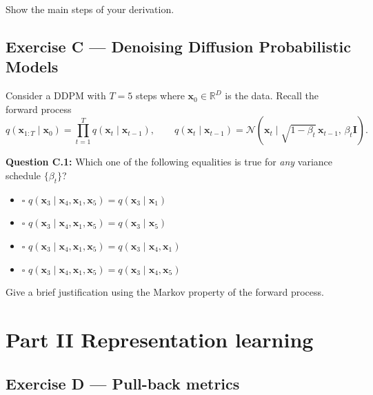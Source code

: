 \documentclass[12pt,a4paper]{article}
\newcommand{\N}{\mathcal{N}}
\begin{document}
Show the main steps of your derivation.

\vspace{3cm}

\newpage
\subsection*{Exercise C --- Denoising Diffusion Probabilistic Models}

Consider a DDPM with $T=5$ steps where $\mathbf{x}_0\in\mathbb{R}^D$ is the data.  Recall the
forward process
\[
  q(\mathbf{x}_{1:T}\mid\mathbf{x}_0) = \prod_{t=1}^T q(\mathbf{x}_t\mid\mathbf{x}_{t-1}),
  \qquad
  q(\mathbf{x}_t\mid\mathbf{x}_{t-1}) = \N(\mathbf{x}_t\mid\sqrt{1-\beta_t}\,\mathbf{x}_{t-1},\,\beta_t\mathbf{I}). \tag{3}
\]

\textbf{Question C.1:} Which one of the following equalities is true for \emph{any} variance
schedule $\{\beta_t\}$?

\begin{itemize}[noitemsep,label={}]
  \item[\textbf{A}] $\square$ \quad $q(\mathbf{x}_3\mid\mathbf{x}_4, \mathbf{x}_1, \mathbf{x}_5) = q(\mathbf{x}_3\mid\mathbf{x}_1)$
  \item[\textbf{B}] $\square$ \quad $q(\mathbf{x}_3\mid\mathbf{x}_4, \mathbf{x}_1, \mathbf{x}_5) = q(\mathbf{x}_3\mid\mathbf{x}_5)$
  \item[\textbf{C}] $\square$ \quad $q(\mathbf{x}_3\mid\mathbf{x}_4, \mathbf{x}_1, \mathbf{x}_5) = q(\mathbf{x}_3\mid\mathbf{x}_4, \mathbf{x}_1)$
  \item[\textbf{D}] $\square$ \quad $q(\mathbf{x}_3\mid\mathbf{x}_4, \mathbf{x}_1, \mathbf{x}_5) = q(\mathbf{x}_3\mid\mathbf{x}_4, \mathbf{x}_5)$
\end{itemize}

Give a brief justification using the Markov property of the forward process.

\vspace{5cm}

\newpage
\section*{Part II \quad Representation learning}

\subsection*{Exercise D --- Pull-back metrics}
\end{document}
